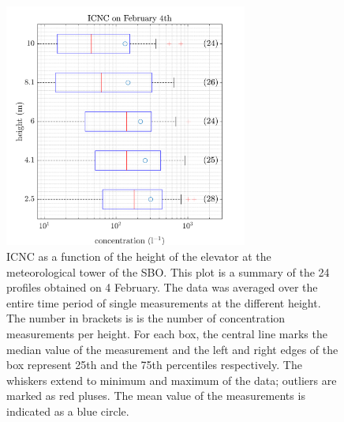 \documentclass[draft,linenumbers]{agujournal}
\begin{document}
\begin{figure}[t]
 \centering
 	\includegraphics[width=8cm]{0402_Total.png}
 \caption{ICNC as a function of the height of the elevator at the meteorological tower of the SBO. This plot is a summary of the 24 profiles obtained on 4 February. The data was averaged over the entire time period of single measurements at the different height. The number in brackets is is the number of concentration measurements per height. For each box, the central line marks the median value of the measurement and the left and right edges of the box represent 25th and the 75th percentiles respectively. The whiskers extend to minimum and maximum of the data; outliers are marked as red pluses. The mean value of the measurements is indicated as a blue circle.}
 \label{fig:Total0402}
\end{figure}
\end{document}
